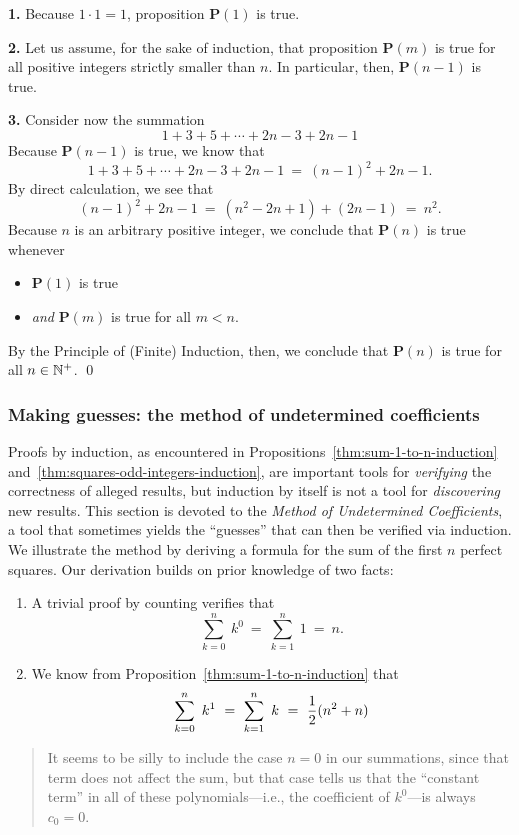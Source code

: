 {\bf 1.} Because $1 \cdot 1 = 1$, proposition {\bf P}$(1)$ is true.

{\bf 2.} Let us assume, for the sake of induction, that proposition
{\bf P}$(m)$ is true for all positive integers strictly smaller than
$n$.  In particular, then, {\bf P}$(n-1)$ is true.

{\bf 3.} Consider now the summation
\[ 1 + 3 + 5 + \cdots + 2n-3 + 2n-1 \]
Because {\bf P}$(n-1)$ is true, we know that
\[ 1 + 3 + 5 + \cdots + 2n-3 + 2n-1 \ = \ (n-1)^2 + 2n-1.  \]
By direct calculation, we see that
\[ (n-1)^2 + 2n-1 \ = \ (n^2 -2n +1) + (2n-1) \ = \ n^2. \]
Because $n$ is an arbitrary positive integer, we conclude that
{\bf P}$(n)$ is true whenever
\begin{itemize}
\item
{\bf P}$(1)$ is true
\item
{\em and}
{\bf P}$(m)$ is true for all $m < n$.
\end{itemize}
By the Principle of (Finite) Induction, then, we conclude that {\bf
  P}$(n)$ is true for all $n \in \mathbb{N}^+$.
\qed



\subsubsection{Making guesses: the method of undetermined coefficients}
\label{sec:undetermined-coefficients1}

Proofs by induction, as encountered in
Propositions~\ref{thm:sum-1-to-n-induction}
and~\ref{thm:squares-odd-integers-induction}, are important tools for
{\em verifying} the correctness of alleged results, but induction by
itself is not a tool for {\em discovering} new results.  This section
is devoted to the {\em Method of Undetermined Coefficients}, a tool
that sometimes yields the ``guesses'' that can then be verified via
induction.  We illustrate the method by deriving a formula for the sum
of the first $n$ perfect squares.  Our derivation builds on prior
knowledge of two facts:
\begin{enumerate}
\item
A trivial proof by counting verifies that
\[ \sum_{k=0}^n \ k^0 \ = \ \sum_{k=1}^n \ 1 \ = \ n.  \]
\item
We know from Proposition~\ref{thm:sum-1-to-n-induction} that
\[
\sum_{k=0}^n \ k^1 \ = \ \sum_{k=1}^n \ k \ = \ {1 \over 2}(n^2 + n)
\]
\end{enumerate}
\begin{quote}
It seems to be silly to include the case $n=0$ in our summations,
since that term does not affect the sum, but that case tells us that
the ``constant term'' in all of these polynomials---i.e., the
coefficient of $k^0$---is always $c_0 =0$.
\end{quote}

